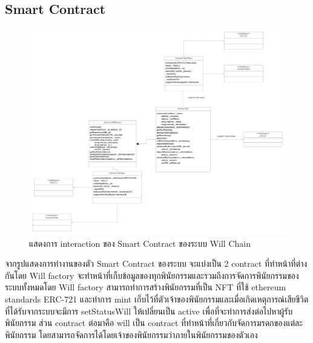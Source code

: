 \documentclass[12pt,oneside,openright,a4paper]{cpe-thai-project}
\begin{document}
\subsection{Smart Contract}
	\begin{figure}[!thb]	
		\centering
		\includegraphics[scale=0.3]{smartContractDiagram}
		\caption{แสดงการ interaction ของ Smart Contract ของระบบ Will Chain}
	\end{figure}
	\FloatBarrier
\tab จากรูปแสดงการทำงานของตัว Smart Contract ของระบบ จะแบ่งเป็น 2 contract ที่ทำหน้าที่ต่างกันโดย Will factory จะทำหน้าที่เก็บข้อมูลของทุกพินัยกรรมและรวมถึงการจัดการพินัยกรรมของระบบทั้งหมดโดย Will factory สามารถทำการสร้างพินัยกรรมที่เป็น NFT ที่ใช้ ethereum standards ERC-721 และทำการ mint เก็บไว้ที่ตัวเจ้าของพินัยกรรมและเมื่อเกิดเหตุการณ์เสียชีวิตที่ได้รับจากระบบจะมีการ setStatusWill ให้เปลี่ยนเป็น active เพื่อที่จะทำการส่งต่อไปหาผู้รับพินัยกรรม ส่วน contract ต่อมาคือ will เป็น contract ที่ทำหน้าที่เกี่ยวกับจัดการมรดกของแต่ละพินัยกรรม โดยสามารถจัดการได้โดยเจ้าของพินัยกรรมว่าภายในพินัยกรรมของตัวเอง
\clearpage
\end{document}
